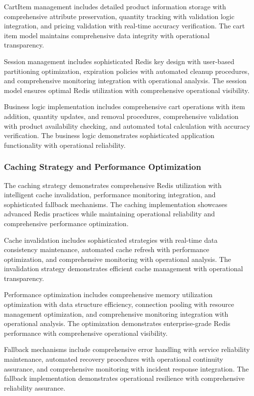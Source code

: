 CartItem management includes detailed product information storage with comprehensive attribute preservation, quantity tracking with validation logic integration, and pricing validation with real-time accuracy verification. The cart item model maintains comprehensive data integrity with operational transparency.

Session management includes sophisticated Redis key design with user-based partitioning optimization, expiration policies with automated cleanup procedures, and comprehensive monitoring integration with operational analysis. The session model ensures optimal Redis utilization with comprehensive operational visibility.

Business logic implementation includes comprehensive cart operations with item addition, quantity updates, and removal procedures, comprehensive validation with product availability checking, and automated total calculation with accuracy verification. The business logic demonstrates sophisticated application functionality with operational reliability.

\subsubsection{Caching Strategy and Performance Optimization}

The caching strategy demonstrates comprehensive Redis utilization with intelligent cache invalidation, performance monitoring integration, and sophisticated fallback mechanisms. The caching implementation showcases advanced Redis practices while maintaining operational reliability and comprehensive performance optimization.

Cache invalidation includes sophisticated strategies with real-time data consistency maintenance, automated cache refresh with performance optimization, and comprehensive monitoring with operational analysis. The invalidation strategy demonstrates efficient cache management with operational transparency.

Performance optimization includes comprehensive memory utilization optimization with data structure efficiency, connection pooling with resource management optimization, and comprehensive monitoring integration with operational analysis. The optimization demonstrates enterprise-grade Redis performance with comprehensive operational visibility.

Fallback mechanisms include comprehensive error handling with service reliability maintenance, automated recovery procedures with operational continuity assurance, and comprehensive monitoring with incident response integration. The fallback implementation demonstrates operational resilience with comprehensive reliability assurance.

